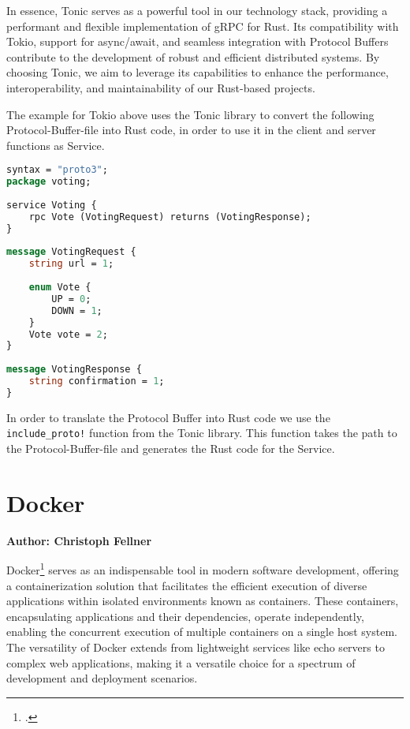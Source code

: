 In essence, Tonic serves as a powerful tool in our technology stack, providing a performant and flexible implementation of gRPC for Rust. Its compatibility with 
Tokio, support for async/await, and seamless integration with Protocol Buffers contribute to the development of robust and efficient distributed systems. By 
choosing Tonic, we aim to leverage its capabilities to enhance the performance, interoperability, and maintainability of our Rust-based projects.\newline

The example for Tokio above uses the Tonic library to convert the following Protocol-Buffer-file into Rust code, in order to use it in the client and server 
functions as Service.

\begin{minipage}{\textwidth}
\begin{lstlisting}[language=ProtoBuf]
syntax = "proto3";
package voting;
        
service Voting {
    rpc Vote (VotingRequest) returns (VotingResponse);
}
        
message VotingRequest {
    string url = 1;
        
    enum Vote {
        UP = 0;
        DOWN = 1;
    }
    Vote vote = 2;    
}
        
message VotingResponse {
    string confirmation = 1;
}
\end{lstlisting}
\end{minipage}

In order to translate the Protocol Buffer into Rust code we use the \verb+include_proto!+ function from the Tonic library. This function takes the path to the 
Protocol-Buffer-file and generates the Rust code for the Service.

\section{Docker}
\textbf{Author: Christoph Fellner}

Docker\footcite{docker} serves as an indispensable tool in modern software development, offering a containerization solution that facilitates the efficient 
execution of diverse applications within isolated environments known as containers. These containers, encapsulating applications and their dependencies, operate 
independently, enabling the concurrent execution of multiple containers on a single host system. The versatility of Docker extends from lightweight services 
like echo servers to complex web applications, making it a versatile choice for a spectrum of development and deployment scenarios.\newline

